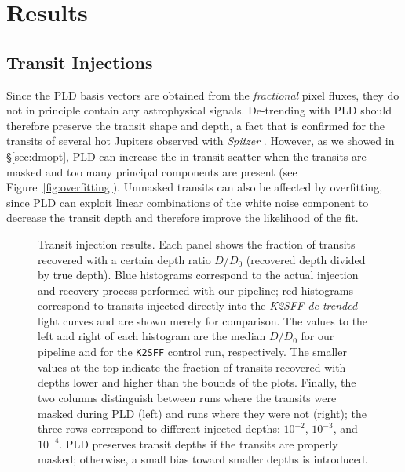 \documentclass[]{emulateapj}
\begin{document}
\section{Results}
\label{sec:results}
\subsection{Transit Injections}
\label{sec:injections}
Since the PLD basis vectors are obtained from the \emph{fractional} pixel fluxes,
they do not in principle contain any astrophysical signals. De-trending with PLD
should therefore preserve the transit shape and depth, a fact that is confirmed
for the transits of several hot Jupiters observed with \emph{Spitzer} \citep{DEM15}.
However, as we showed in \S\ref{sec:dmopt}, PLD can increase the
in-transit scatter when the transits are masked and too many principal components 
are present (see Figure~\ref{fig:overfitting}). Unmasked transits can also be affected
by overfitting, since PLD can exploit linear combinations of the white noise component
to decrease the transit depth and therefore improve the likelihood of the fit.

\begin{figure}[h]
  \begin{center}
       \caption{Transit injection results. Each panel shows the fraction of transits
                recovered with a certain depth ratio $D/D_0$ (recovered depth divided
                by true depth). Blue histograms correspond to the actual injection
                and recovery process performed with our pipeline; red histograms
                correspond to transits injected directly into the \emph{K2SFF de-trended}
                light curves and are shown merely for comparison. The values to the left
                and right of each histogram are the median $D/D_0$ for our pipeline
                and for the \texttt{K2SFF} control run, respectively. The smaller values at the
                top indicate the fraction of transits recovered with depths lower and
                higher than the bounds of the plots. Finally, the two columns distinguish
                between runs where the transits were masked during PLD (left) and runs
                where they were not (right); the three rows correspond to different
                injected depths: $10^{-2}$, $10^{-3}$, and $10^{-4}$. PLD preserves
                transit depths if the transits are properly masked; otherwise, a small bias
                toward smaller depths is introduced.}
     \label{fig:injections}
  \end{center}
\end{figure}
\end{document}

